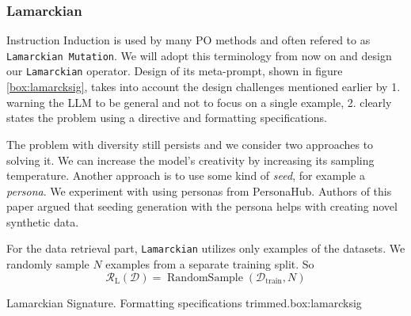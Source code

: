 \subsubsection{Lamarckian}
Instruction Induction\cite{honovich2022instructioninductionexamplesnatural} is used by many PO methods and often refered to as \texttt{Lamarckian Mutation}. 
We will adopt this terminology from now on and design our \texttt{Lamarckian} operator. 
Design of its meta-prompt, shown in figure \ref{box:lamarcksig}, takes into account the design challenges mentioned earlier by 1. warning the LLM to be general and not to focus on a single example, 
2. clearly states the problem using a directive and formatting specifications. 

The problem with diversity still persists and we consider two approaches to solving it. 
We can increase the model's creativity by increasing its sampling temperature. Another approach is to use
some kind of \textit{seed}, for example a \textit{persona}. We experiment with using personas from PersonaHub\cite{ge2024scalingsyntheticdatacreation}.
Authors of this paper argued that seeding generation with the persona helps with creating novel synthetic data. 

For the data retrieval part, \texttt{Lamarckian} utilizes only examples of the datasets. 
We randomly sample $N$ examples from a separate training split. So
\begin{equation}
    \mathcal{R}_{\text{L}}(\mathcal{D}) = \operatorname{RandomSample}(\mathcal{D}_{\text{train}}, N)
\end{equation}
\begin{figurebox}{Lamarckian Signature. Formatting specifications trimmed.}{box:lamarcksig}
\end{figurebox}
\newpage

